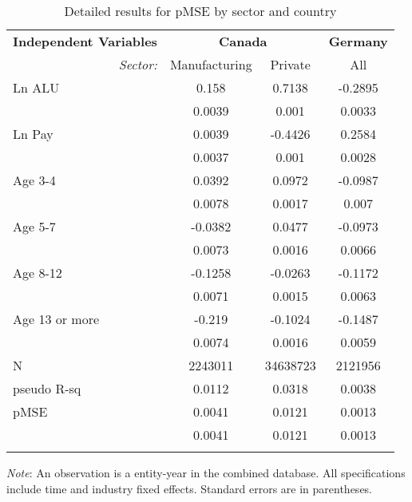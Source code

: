 
\begin{table}[!htbp] \centering 
\setlength{\tabcolsep}{11pt}
\begin{threeparttable}
  \caption{Detailed results for pMSE by sector and country} 
  \label{tab:pmse:details} 
\begin{tabular}{@{\extracolsep{5pt}} l|cc|c} 
\toprule
\textbf{Independent Variables} & \multicolumn{2}{c}{\textbf{Canada}} & \textbf{Germany}\\
\multicolumn{1}{r}{\it Sector:}&Manufacturing & Private & All \\ 
\midrule
Ln ALU & 0.158 & 0.7138 & -0.2895 \\ 
 & 0.0039 & 0.001 & 0.0033 \\ 
Ln Pay & 0.0039 & -0.4426 & 0.2584 \\ 
 & 0.0037 & 0.001 & 0.0028 \\ 
Age 3-4 & 0.0392 & 0.0972 & -0.0987 \\ 
 & 0.0078 & 0.0017 & 0.007 \\ 
Age 5-7 & -0.0382 & 0.0477 & -0.0973 \\ 
 & 0.0073 & 0.0016 & 0.0066 \\ 
Age 8-12 & -0.1258 & -0.0263 & -0.1172 \\ 
 & 0.0071 & 0.0015 & 0.0063 \\ 
Age 13 or more & -0.219 & -0.1024 & -0.1487 \\ 
 & 0.0074 & 0.0016 & 0.0059 \\ 
N & 2243011 & 34638723 & 2121956 \\ 
pseudo R-sq & 0.0112 & 0.0318 & 0.0038 \\ 
pMSE & 0.0041 & 0.0121 & 0.0013 \\ 
 & 0.0041 & 0.0121 & 0.0013 \\ 
\endrule
\end{tabular} 
\begin{tablenotes}
\small
\item \textit{Note}: An observation is a entity-year in the combined database. All specifications include  time and industry fixed effects. Standard errors are in parentheses. 
\end{tablenotes}
\end{threeparttable}
\end{table} 
